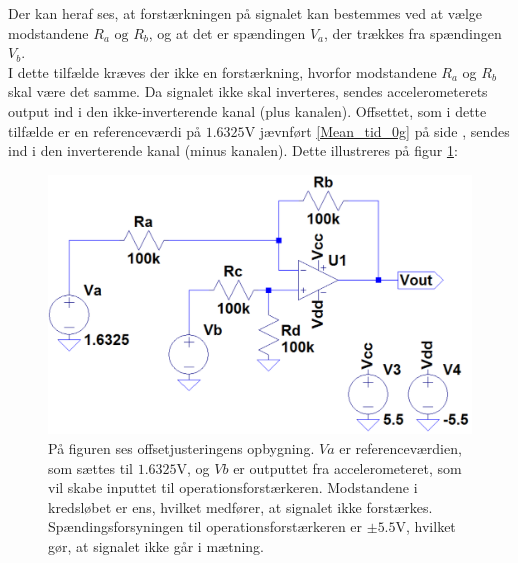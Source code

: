 \noindent Der kan heraf ses, at forstærkningen på signalet kan bestemmes ved at vælge modstandene $R_a\text{ og }R_b$, og at det er spændingen $V_{a}$, der trækkes fra spændingen $V_{b}$. \\
I dette tilfælde kræves der ikke en forstærkning, hvorfor modstandene $R_{a}$ og $R_{b}$ skal være det samme. Da signalet ikke skal inverteres, sendes accelerometerets output ind i den ikke-inverterende kanal (plus kanalen). Offsettet, som i dette tilfælde er en referenceværdi på $1.6325$V jævnført \ref{Mean_tid_0g} på side \pageref{Mean_tid_0g}, sendes ind i den inverterende kanal (minus kanalen). Dette illustreres på figur \ref{fig:Offset_generisk}:
\begin{figure}[H]
\centering
\includegraphics[scale=0.3]{figures/cProblemloesning/Offset_generisk.png}
\caption{På figuren ses offsetjusteringens opbygning. $Va$ er referenceværdien, som sættes til $1.6325$V, og $Vb$ er outputtet fra accelerometeret, som vil skabe inputtet til operationsforstærkeren. Modstandene i kredsløbet er ens, hvilket medfører, at signalet ikke forstærkes. Spændingsforsyningen til operationsforstærkeren er $\pm5.5$V, hvilket gør, at signalet ikke går i mætning.}
\label{fig:Offset_generisk}
\end{figure}

